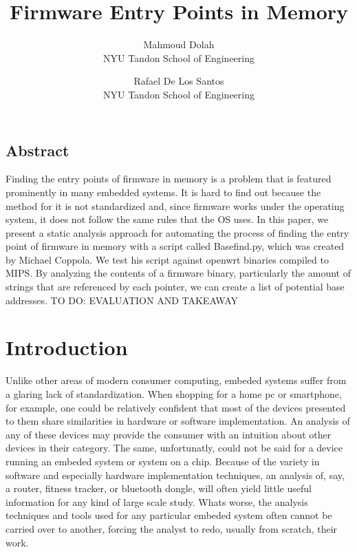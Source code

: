 \documentclass[letterpaper,twocolumn,10pt]{article}
\begin{document}
\title{\Large \bf Firmware Entry Points in Memory}
\author{
    {\rm Mahmoud Dolah}\\
    NYU Tandon School of Engineering
    \and
    {\rm Rafael De Los Santos}\\
    NYU Tandon School of Engineering
}

\date{}

\maketitle

\thispagestyle{empty}

\subsection*{Abstract}
Finding the entry points of firmware in memory is a problem that is featured prominently in many embedded systems. It is hard to find out because the method for it is not standardized and, since firmware works under the operating system, it does not follow the same rules that the OS uses. In this paper, we present a static analysis approach for automating the process of finding the entry point of firmware in memory with a script called Basefind.py, which was created by Michael Coppola. We test his script against openwrt binaries compiled to MIPS. By analyzing the contents of a firmware binary, particularly the amount of strings that are referenced by each pointer, we can create a list of potential base addresses.  
TO DO: EVALUATION AND TAKEAWAY

\section{Introduction}
Unlike other areas of modern consumer computing, embeded systems suffer from a glaring lack of standardization. When shopping for a home pc or smartphone, for example, one could be relatively confident that most of the devices presented to them share similarities in hardware or software implementation. An analysis of any of these devices may provide the consumer with an intuition about other devices in their category. The same, unfortunatly, could not be said for a device running an embeded system or system on a chip. Because of the variety in software and especially hardware implementation techniques, an analysis of, say, a router, fitness tracker, or bluetooth dongle, will often yield little useful information for any kind of large scale study. Whats worse, the analysis techniques and tools used for any particular embeded system often cannot be carried over to another, forcing the analyst to redo, usually from scratch, their work.
\end{document}
